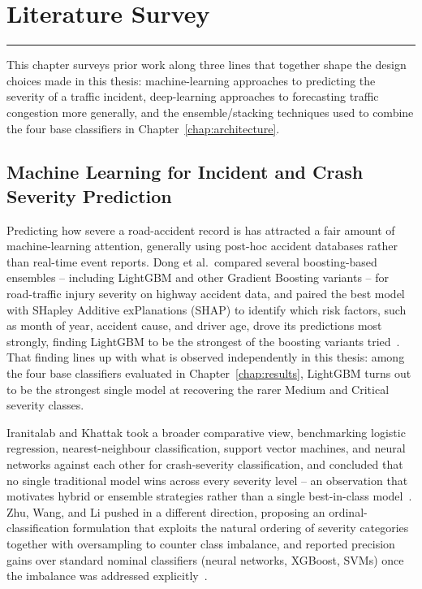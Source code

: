 \chapter{Literature Survey}
\label{chap:lit-survey}
\noindent \rule{6.6in}{0.01in}
\newpage

This chapter surveys prior work along three lines that together shape the design choices made in this thesis: machine-learning approaches to predicting the severity of a traffic incident, deep-learning approaches to forecasting traffic congestion more generally, and the ensemble/stacking techniques used to combine the four base classifiers in Chapter~\ref{chap:architecture}.

\section{Machine Learning for Incident and Crash Severity Prediction}

Predicting how severe a road-accident record is has attracted a fair amount of machine-learning attention, generally using post-hoc accident databases rather than real-time event reports. Dong et al.\ compared several boosting-based ensembles -- including LightGBM and other Gradient Boosting variants -- for road-traffic injury severity on highway accident data, and paired the best model with SHapley Additive exPlanations (SHAP) to identify which risk factors, such as month of year, accident cause, and driver age, drove its predictions most strongly, finding LightGBM to be the strongest of the boosting variants tried~\cite{dong2022predicting}. That finding lines up with what is observed independently in this thesis: among the four base classifiers evaluated in Chapter~\ref{chap:results}, LightGBM turns out to be the strongest single model at recovering the rarer Medium and Critical severity classes.

Iranitalab and Khattak took a broader comparative view, benchmarking logistic regression, nearest-neighbour classification, support vector machines, and neural networks against each other for crash-severity classification, and concluded that no single traditional model wins across every severity level -- an observation that motivates hybrid or ensemble strategies rather than a single best-in-class model~\cite{iranitalab2017comparison}. Zhu, Wang, and Li pushed in a different direction, proposing an ordinal-classification formulation that exploits the natural ordering of severity categories together with oversampling to counter class imbalance, and reported precision gains over standard nominal classifiers (neural networks, XGBoost, SVMs) once the imbalance was addressed explicitly~\cite{zhu2021crash}.


